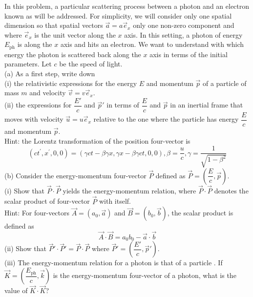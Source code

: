 \begin{example}
    In this problem, a particular scattering process between a photon and an electron known as  will be addressed. For simplicity, we will consider only one spatial dimension so that spatial vectors $\vec{a}=a\vec{e}_x$   only one non-zero component and where $\vec{e}_x$ is the unit vector along the $x$ axis. In this setting, a photon of energy $E_\mathrm{ph}$ is  along the $x$ axis and hits an electron. We want to understand with which energy the photon is scattered back along the $x$ axis in terms of the initial parameters. Let $c$ be the speed of light.
\\(a) As a first step, write down
\\\hspace*{2em}(i) the relativistic expressions for the energy $E$ and momentum $\vec{p}$ of a particle of mass $m$ and velocity $\vec{v} = v\vec{e}_x$.
\\\hspace*{2em}(ii) the expressions for $\dfrac{E'}{c}$ and $\vec{p}'$ in terms of $\dfrac{E}{c}$ and $\vec{p}$ in an inertial frame that moves with
velocity $\vec{u}=u\vec{e}_{x}$ relative to the one where the particle has energy $\dfrac{E}{c}$ and momentum $\vec{p}$.\\
Hint: the Lorentz transformation of the position four-vector is \[(ct^{\prime},x^{\prime},0,0)=(\gamma ct-\beta\gamma x,\gamma x-\beta \gamma ct, 0, 0), \beta = \dfrac{u}{c}, \gamma = \dfrac{1}{\sqrt {1- \beta ^2}}\]
(b) Consider the energy-momentum four-vector $\vec{P}$ defined as $\vec{P}=(\dfrac{E}{c},\vec{p})$.\\
\hspace*{2em}(i) Show that $\vec{P}\cdot\vec{P}$ yields the energy-momentum relation, where $\vec{P}\cdot\vec{P}$ denotes the scalar product of four-vector $\vec{P}$ with itself.\\ Hint: For four-vectors $\vec{A}=(a_0,\vec{a})$ and $\vec{B}=(b_0,\vec{b})$, the scalar product is defined as  \[\vec{A}\cdot\vec{B}=a_{0}b_{0}-\vec{a}\cdot\vec{b}\]
\hspace*{2em}(ii) Show that $\vec{P}'\cdot\vec{P}'=\vec{P}\cdot\vec{P}$ where $\vec{P}'=(\dfrac{E'}{c},\vec{p}')$.\\
\hspace*{2em}(iii) The energy-momentum relation for a photon is that of a particle . If $\vec{K} = ( \dfrac{E_{\mathrm{ph}}}{c}, \vec{k} )$ is the energy-momentum four-vector of a photon, what is the value of $\vec{K}\cdot\vec{K}$?\\

\end{example}
